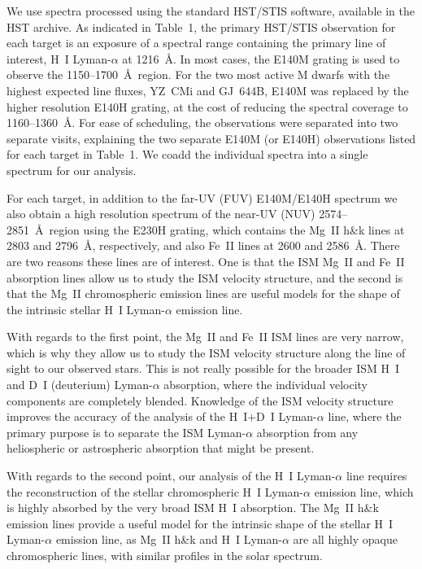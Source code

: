 \documentclass[preprint]{aastex}
\begin{document}
     We use spectra processed using the standard HST/STIS software,
available in the HST archive.  As indicated in Table~1, the primary HST/STIS
observation for each
target is an exposure of a spectral range containing the primary line of
interest, H~I Lyman-$\alpha$ at 1216~\AA.  In most cases, the E140M
grating is used to observe the 1150--1700~\AA\ region.  For the two most
active M dwarfs with the highest expected line fluxes, YZ~CMi and GJ~644B,
E140M was replaced by the higher resolution E140H grating, at the cost of
reducing the spectral coverage to 1160--1360~\AA.  For ease of scheduling,
the observations were separated into two separate visits, explaining the
two separate E140M (or E140H) observations listed for each target in Table~1.
We coadd the individual spectra into a single spectrum for our analysis.

     For each target, in addition to the far-UV (FUV) E140M/E140H spectrum we
also obtain a high resolution spectrum of the near-UV (NUV) 2574--2851~\AA\
region using the E230H grating, which contains the Mg~II h\&k lines at
2803 and 2796~\AA, respectively, and also Fe~II lines at 2600 and 2586~\AA.
There are two reasons these lines are of interest.  One is that the ISM
Mg~II and Fe~II absorption lines allow us to study the ISM velocity
structure, and the second is that the Mg~II chromospheric emission lines
are useful models for the shape of the intrinsic stellar H~I Lyman-$\alpha$
emission line.

     With regards to the first point, the Mg~II and Fe~II ISM lines are
very narrow, which is why they allow us to study the ISM velocity structure
along the line of sight to our observed stars.  This is not really
possible for the broader ISM H~I and D~I (deuterium) Lyman-$\alpha$
absorption, where the individual velocity components are completely blended.
Knowledge of the ISM velocity structure improves the accuracy of the analysis
of the H~I+D~I Lyman-$\alpha$ line, where the primary purpose is to separate
the ISM Lyman-$\alpha$ absorption from any heliospheric or astrospheric
absorption that might be present.

     With regards to the second point, our analysis of the H~I Lyman-$\alpha$
line requires the reconstruction of the stellar chromospheric H~I
Lyman-$\alpha$ emission line, which is highly absorbed by the very broad
ISM H~I absorption.  The Mg~II h\&k emission lines provide a useful model for
the intrinsic shape of the stellar H~I Lyman-$\alpha$ emission line, as
Mg~II h\&k and H~I Lyman-$\alpha$ are all highly opaque chromospheric lines,
with similar profiles in the solar spectrum.
\end{document}

